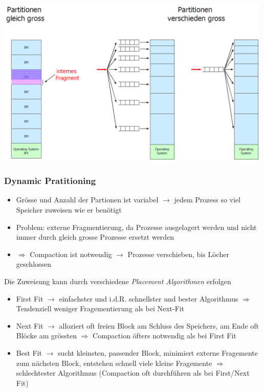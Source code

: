 \documentclass{report}
\newenvironment{Figure}
	{\par\medskip\noindent\minipage{\linewidth}}
	{\endminipage\par\medskip}
\theoremstyle{definition}
\theoremstyle{example}
\begin{document}
\begin{Figure}
\centering
\includegraphics[width=500px]{img/FixedPartitioning.png}
	\label{fig:Abbildung fixed partitioning}
\end{Figure}

		\subsubsection{Dynamic Pratitioning}
\begin{itemize}
	\item Grösse und Anzahl der Partionen ist variabel $\rightarrow$ jedem Prozess so viel Speicher zuweisen wie er benötigt
	\item Problem: externe Fragmentierung, da Prozesse ausgelagert werden und nicht immer durch gleich grosse Prozesse ersetzt werden
	\item $\Rightarrow$ Compaction ist notwendig $\rightarrow$ Prozesse verschieben, bis Löcher geschlossen
\end{itemize}

Die Zuweisung kann durch verschiedene \textit{Placement Algorithmen} erfolgen
\begin{itemize}
	\item First Fit $\rightarrow$ einfachster und i.d.R. schnellster und bester Algorithmus $\Rightarrow$ Tendenziell weniger Fragementierung als bei Next-Fit
	\item Next Fit $\rightarrow$ alloziert oft freien Block am Schluss des Speichers, am Ende oft Blöcke am grössten $\Rightarrow$ Compaction öfters notwendig als bei First Fit
	\item Best Fit $\rightarrow$ sucht kleinsten, passender Block, minimiert externe Fragemente zum nächsten Block, entstehen schnell viele kleine Fragemente $\Rightarrow$ schlechtester Algorithmus (Compaction oft durchführen als bei First/Next Fit)
\end{itemize}
\end{document}
